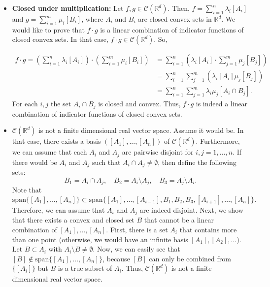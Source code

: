 \documentclass[fontsize=11pt, paper=a4]{scrartcl}
\begin{document}


\begin{itemize}
    \item \textbf{Closed under multiplication:} Let $f,g \in \mathcal C(\mathbb R^d)$. Then, $f = \sum_{i=1}^{n}\lambda_i [A_i]$ and $g = \sum_{i=1}^m \mu_i [B_i]$, where $A_i$ and $B_i$ are closed convex sets in $\mathbb R^d$. We would like to prove that $f \cdot g$ is a linear combination of indicator functions of closed convex sets. In that case, $f \cdot g \in \mathcal C(\mathbb R^d)$. So,
    
    \begin{align*}
        f \cdot g = \left(\sum_{i=1}^{n}\lambda_i [A_i]\right) \cdot \left(\sum_{i=1}^m \mu_i [B_i]\right) &= \sum_{i=1}^{n}\left(\lambda_i[A_i] \cdot  \sum_{j=1}^m \mu_j [B_j] \right) \\
        &= \sum^n_{i=1}\sum^m_{j=1}\left(\lambda_i[A_i]\mu_j[B_j]\right) \\
        &= \sum^n_{i=1}\sum^m_{j=1} \lambda_i\mu_j[A_i \cap B_j].
    \end{align*}
    For each $i,j$ the set $A_i \cap B_j$ is closed and convex. Thus, $f\cdot g$ is indeed a linear combination of indicator functions of closed convex sets.

    \item $\mathcal C(\mathbb R^d)$ is not a finite dimensional real vector space. Assume it would be. In that case, there exists a basis $\left([A_1],...,[A_n]\right)$ of $\mathcal C(\mathbb R^d)$. Furthermore, we can assume that each $A_i$ and $A_j$ are pairwise disjoint for $i,j = 1,...,n$. If there would be $A_i$ and $A_j$ such that $A_i \cap A_j \neq \emptyset$, then define the following sets: 
    $$
        B_1 = A_i \cap A_j, \quad B_{2} = A_i \setminus A_j, \quad B_3 = A_j \setminus A_i.
    $$
    Note that 
    $$
        \mathrm{span}\{[A_1],...,[A_n]\} \subset \mathrm{span}\{[A_1],...,[A_{i-1}],B_1,B_2,B_3,[A_{i+1}],...,[A_n]\}.
    $$
    Therefore, we can assume that $A_i$ and $A_j$ are indeed disjoint. Next, we show that there exists a convex and closed set $B$ that cannot be a linear combination of $[A_1],...,[A_n]$. First, there is a set $A_i$ that contains more than one point (otherwise, we would have an infinite basis $[A_1],[A_2],...$). Let $B \subset A_i$ with $A_i \setminus B \neq \emptyset$. Now, we can easily see that $[B] \notin \mathrm{span}\{[A_1],...,[A_n]\}$, because $[B]$ can only be combined from $\{[A_i]\}$ but $B$ is a true subset of $A_i$. Thus, $\mathcal C(\mathbb R^d)$ is not a finite dimensional real vector space.


\end{itemize}
\end{document}
